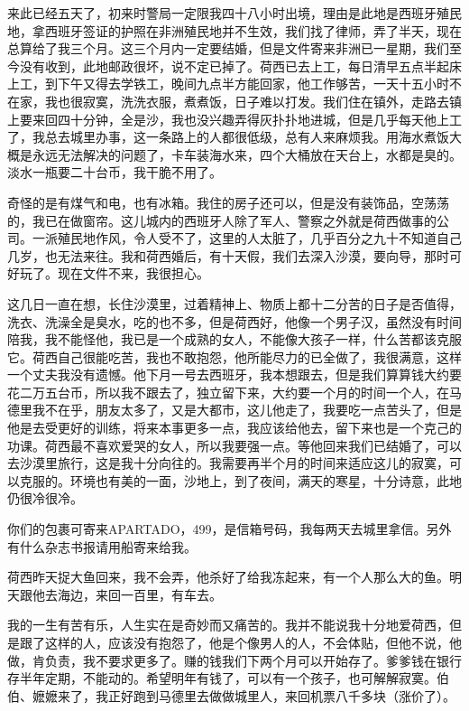 \par {}
\par 来此已经五天了，初来时警局一定限我四十八小时出境，理由是此地是西班牙殖民地，拿西班牙签证的护照在非洲殖民地并不生效，我们找了律师，弄了半天，现在总算给了我三个月。这三个月内一定要结婚，但是文件寄来非洲已一星期，我们至今没有收到，此地邮政很坏，说不定已掉了。荷西已去上工，每日清早五点半起床上工，到下午又得去学铁工，晚间九点半方能回家，他工作够苦，一天十五小时不在家，我也很寂寞，洗洗衣服，煮煮饭，日子难以打发。我们住在镇外，走路去镇上要来回四十分钟，全是沙，我也没兴趣弄得灰扑扑地进城，但是几乎每天他上工了，我总去城里办事，这一条路上的人都很低级，总有人来麻烦我。用海水煮饭大概是永远无法解决的问题了，卡车装海水来，四个大桶放在天台上，水都是臭的。淡水一瓶要二十台币，我干脆不用了。
\par 奇怪的是有煤气和电，也有冰箱。我住的房子还可以，但是没有装饰品，空荡荡的，我已在做窗帘。这儿城内的西班牙人除了军人、警察之外就是荷西做事的公司。一派殖民地作风，令人受不了，这里的人太脏了，几乎百分之九十不知道自己几岁，也无法来往。我和荷西婚后，有十天假，我们去深入沙漠，要向导，那时可好玩了。现在文件不来，我很担心。
\par 这几日一直在想，长住沙漠里，过着精神上、物质上都十二分苦的日子是否值得，洗衣、洗澡全是臭水，吃的也不多，但是荷西好，他像一个男子汉，虽然没有时间陪我，我不能怪他，我已是一个成熟的女人，不能像大孩子一样，什么苦都该克服它。荷西自己很能吃苦，我也不敢抱怨，他所能尽力的已全做了，我很满意，这样一个丈夫我没有遗憾。他下月一号去西班牙，我本想跟去，但是我们算算钱大约要花二万五台币，所以我不跟去了，独立留下来，大约要一个月的时间一个人，在马德里我不在乎，朋友太多了，又是大都市，这儿他走了，我要吃一点苦头了，但是他是去受更好的训练，将来本事更多一点，我应该给他去，留下来也是一个克己的功课。荷西最不喜欢爱哭的女人，所以我要强一点。等他回来我们已结婚了，可以去沙漠里旅行，这是我十分向往的。我需要再半个月的时间来适应这儿的寂寞，可以克服的。环境也有美的一面，沙地上，到了夜间，满天的寒星，十分诗意，此地仍很冷很冷。
\par 你们的包裹可寄来APARTADO，499，是信箱号码，我每两天去城里拿信。另外有什么杂志书报请用船寄来给我。
\par 荷西昨天捉大鱼回来，我不会弄，他杀好了给我冻起来，有一个人那么大的鱼。明天跟他去海边，来回一百里，有车去。
\par 我的一生有苦有乐，人生实在是奇妙而又痛苦的。我并不能说我十分地爱荷西，但是跟了这样的人，应该没有抱怨了，他是个像男人的人，不会体贴，但他不说，他做，肯负责，我不要求更多了。赚的钱我们下两个月可以开始存了。爹爹钱在银行存半年定期，不能动的。希望明年有钱了，可以有一个孩子，也可解解寂寞。伯伯、嬷嬷来了，我正好跑到马德里去做做城里人，来回机票八千多块（涨价了）。
